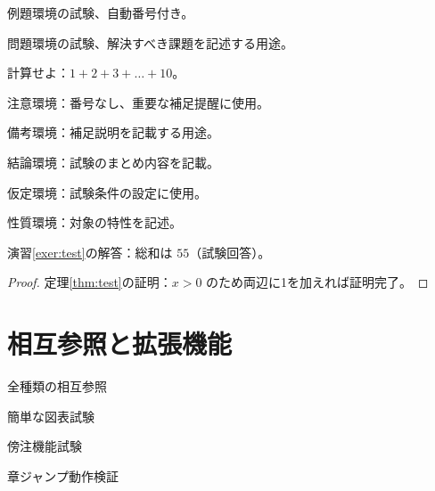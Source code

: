 \documentclass[jp]{../../elegantbook}
\begin{document}
\begin{definition}[試験定義]
\begin{theorem}[試験定理]
\begin{lemma}[試験補題]
\begin{corollary}[試験系]
\begin{axiom}[試験公理]
\begin{postulate}[試験公準]
\begin{proposition}[試験命題]
\begin{example}\label{exa:test}
例題環境の試験、自動番号付き。
\end{example}

\begin{problem}\label{probl:test}
問題環境の試験、解決すべき課題を記述する用途。
\end{problem}

\begin{exercise}\label{exer:test}
計算せよ：$1+2+3+\dots+10$。
\end{exercise}

\begin{note}
注意環境：番号なし、重要な補足提醒に使用。
\end{note}

\begin{remark}
備考環境：補足説明を記載する用途。
\end{remark}

\begin{conclusion}
結論環境：試験のまとめ内容を記載。
\end{conclusion}

\begin{assumption}
仮定環境：試験条件の設定に使用。
\end{assumption}

\begin{property}
性質環境：対象の特性を記述。
\end{property}

\begin{solution}
演習\ref{exer:test}の解答：総和は $55$（試験回答）。
\end{solution}

\begin{proof}
定理\ref{thm:test}の証明：$x>0$ のため両辺に1を加えれば証明完了。
\end{proof}

\chapter{相互参照と拡張機能}
\begin{introduction}
\item 全種類の相互参照
\item 簡単な図表試験
\item 傍注機能試験
\item 章ジャンプ動作検証
\end{introduction}


\end{proposition}
\end{postulate}
\end{axiom}
\end{corollary}
\end{lemma}
\end{theorem}
\end{definition}
\end{document}
